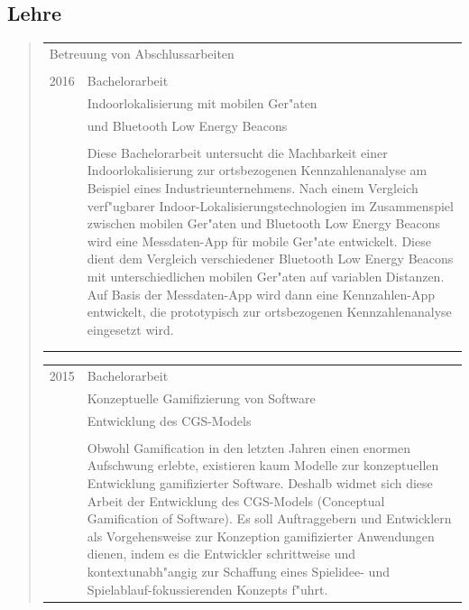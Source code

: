 \subsection*{Lehre}
\ifshowLehreBetreuung
\begin{quote}
 	\begin{tabular}{p{4cm}l}
 		\multicolumn{2}{l}{Betreuung von Abschlussarbeiten}\\\\
 		2016&Bachelorarbeit\\
 		&\qquad Indoorlokalisierung mit mobilen Ger"aten \\
 		&\qquad und Bluetooth Low Energy Beacons\\\\
 		&\begin{minipage}{10cm}
 		Diese Bachelorarbeit untersucht die Machbarkeit einer Indoorlokalisierung zur ortsbezogenen Kennzahlenanalyse am Beispiel eines Industrieunternehmens. Nach einem Vergleich verf"ugbarer Indoor-Lokalisierungstechnologien im Zusammenspiel zwischen mobilen Ger"aten und Bluetooth Low Energy Beacons wird eine Messdaten-App für mobile Ger"ate entwickelt. Diese dient dem Vergleich verschiedener Bluetooth Low Energy Beacons mit unterschiedlichen mobilen Ger"aten auf variablen Distanzen. Auf Basis der Messdaten-App wird dann eine Kennzahlen-App entwickelt, die prototypisch zur ortsbezogenen Kennzahlenanalyse eingesetzt wird.
		\end{minipage}\\\\\\
	\end{tabular}
 	\begin{tabular}{p{4cm}l}
 		2015&Bachelorarbeit\\
 		&\qquad Konzeptuelle Gamifizierung von Software\\
 		&\qquad Entwicklung des CGS-Models\\\\
 		&\begin{minipage}{10cm}
 		Obwohl Gamification in den letzten Jahren einen enormen Aufschwung erlebte, existieren kaum Modelle zur konzeptuellen Entwicklung gamifizierter Software. Deshalb widmet sich diese Arbeit der Entwicklung des CGS-Models (Conceptual Gamification of Software). Es soll Auftraggebern und Entwicklern als Vorgehensweise zur Konzeption gamifizierter Anwendungen dienen, indem es die Entwickler schrittweise und kontextunabh"angig zur Schaffung eines Spielidee- und Spielablauf-fokussierenden Konzepts f"uhrt.

\end{minipage}
\end{tabular}
\end{quote}
